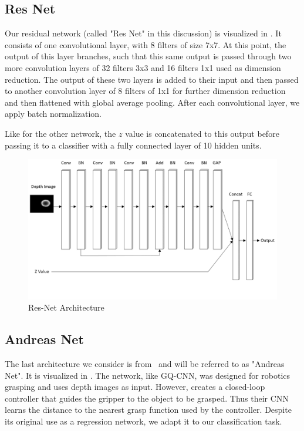 \subsection{Res Net}

Our residual network (called "Res Net" in this discussion) is visualized in . 
It consists of one convolutional layer, with 8 filters of size 7x7.
At this point, the output of this layer branches, such that this same output is passed through two more convolution layers of 32 filters 3x3 and 16 filters 1x1 used as dimension reduction. 
The output of these two layers is added to their input and then passed to another convolution layer of 8 filters of 1x1 for further dimension reduction and then flattened with global average pooling. 
After each convolutional layer, we apply batch normalization. 

Like for the other network, the $z$ value is concatenated to this output before passing it to a classifier with a fully connected layer of 10 hidden units.


\begin{figure}[t!]
    \includegraphics[width=0.99\columnwidth]{figs/res_net.png}
\caption{Res-Net Architecture} \label{fig:res_net}
\end{figure}

\subsection{Andreas Net}
The last architecture we consider is from~\cite{viereck2017learning} and will be referred to as "Andreas Net". 
It is visualized in . 
The network, like GQ-CNN, was designed for robotics grasping and uses depth images as input. 
However, \cite{viereck2017learning} creates a closed-loop controller that guides the gripper to the object to be grasped. 
Thus their CNN learns the distance to the nearest grasp function used by the controller. 
Despite its original use as a regression network, we adapt it to our classification task. 

